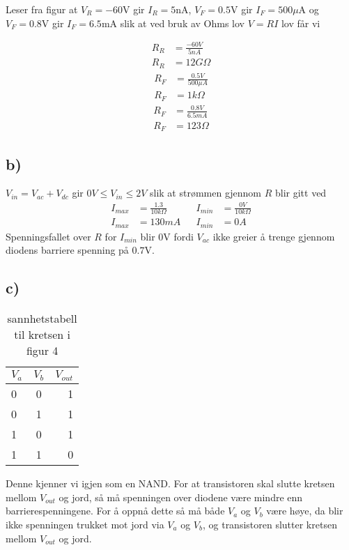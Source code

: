 \documentclass[11pt]{article}
\begin{document}
Leser fra figur at $V_{R} = -60$V gir $I_{R} = 5$nA, $V_{F} = 0.5$V gir $I_{F} = 500\mu$A og $V_{F} = 0.8$V gir $I_{F} = 6.5$mA slik at ved bruk av Ohms lov $V = RI$ lov får vi
\begin{multicols}{3}\noindent
\begin{align*}
R_{R} &= \frac{-60V}{5nA} \\
R_{R} &= 12G\Omega
\end{align*}
\begin{align*}
R_{F} &= \frac{0.5V}{500\mu A} \\
R_{F} &= 1k\Omega
\end{align*}
\begin{align*}
R_{F} &= \frac{0.8V}{6.5mA} \\
R_{F} &= 123\Omega
\end{align*}
\end{multicols}

\subsection*{b)}

$V_{in} = V_{ac} + V_{dc}$ gir $0V \leq V_{in} \leq 2V$ slik at strømmen gjennom $R$ blir gitt ved
\begin{align*}
I_{max} &= \frac{1.3}{10k\Omega} && I_{min} &= \frac{0V}{10k\Omega} \\
I_{max} &= 130mA && I_{min} &= 0A
\end{align*}
Spenningsfallet over $R$ for $I_{min}$ blir $0$V fordi $V_{ac}$ ikke greier å trenge gjennom diodens barriere spenning på $0.7$V.

\subsection*{c)}

\begin {table}[H]
\centering
\begin{tabular}{ l  c | r }
$V_{a}$ & $V_{b}$ & $V_{out}$ \\
\hline
0 & 0 & 1 \\
0 & 1 & 1 \\
1 & 0 & 1 \\
1 & 1 & 0 \\
\end{tabular}
\caption{sannhetstabell til kretsen i figur 4}
\end{table}
Denne kjenner vi igjen som en NAND. For at transistoren skal slutte kretsen mellom $V_{out}$ og jord, så må spenningen over diodene være mindre enn barrierespenningene. For å oppnå dette så må både $V_{a}$ og $V_{b}$ være høye, da blir ikke spenningen trukket mot jord via $V_{a}$ og $V_{b}$, og transistoren slutter kretsen mellom $V_{out}$ og jord.
\end{document}
